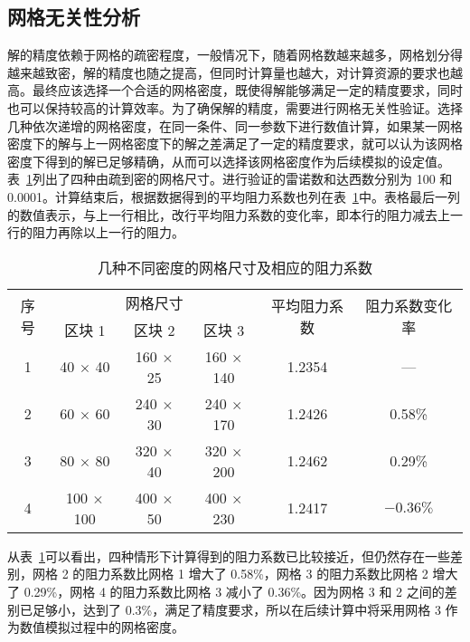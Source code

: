 \subsection{网格无关性分析}\label{sec: grid-independent}

解的精度依赖于网格的疏密程度，一般情况下，随着网格数越来越多，网格划分得越来越致密，解的精度也随之提高，但同时计算量也越大，对计算资源的要求也越高。最终应该选择一个合适的网格密度，既使得解能够满足一定的精度要求，同时也可以保持较高的计算效率。为了确保解的精度，需要进行网格无关性验证。选择几种依次递增的网格密度，在同一条件、同一参数下进行数值计算，如果某一网格密度下的解与上一网格密度下的解之差满足了一定的精度要求，就可以认为该网格密度下得到的解已足够精确，从而可以选择该网格密度作为后续模拟的设定值。表~\ref{tab: grid}列出了四种由疏到密的网格尺寸。进行验证的雷诺数和达西数分别为 100 和 0.0001。计算结束后，根据数据得到的平均阻力系数也列在表~\ref{tab: grid}中。表格最后一列的数值表示，与上一行相比，改行平均阻力系数的变化率，即本行的阻力减去上一行的阻力再除以上一行的阻力。

\begin{table}
	\caption{几种不同密度的网格尺寸及相应的阻力系数}\label{tab: grid}
	\vspace{.5em}\centering\wuhao
	\begin{tabular}{cccccc}
		\toprule[1.5pt]
		\multirow{2}[3]{*}{序号} & \multicolumn{3}{c}{网格尺寸} & \multirow{2}[3]{*}{平均阻力系数} & \multirow{2}[3]{*}{阻力系数变化率} \\
		\cmidrule[.67pt](lr){2-4}
		& 区块 1 & 区块 2 & 区块 3 & & \\
		\midrule[1pt]
		1 & 40 $\times$ 40 & 160 $\times$ 25 & 160 $\times$ 140 & 1.2354 & — \\
		2 & 60 $\times$ 60 & 240 $\times$ 30 & 240 $\times$ 170 & 1.2426 & 0.58\% \\
		3 & 80 $\times$ 80 & 320 $\times$ 40 & 320 $\times$ 200 & 1.2462 & 0.29\% \\
		4 & 100 $\times$ 100 & 400 $\times$ 50 & 400 $\times$ 230 & 1.2417 & $-0.36\%$ \\
		\bottomrule[1.5pt]
	\end{tabular}
\end{table}

从表~\ref{tab: grid}可以看出，四种情形下计算得到的阻力系数已比较接近，但仍然存在一些差别，网格 2 的阻力系数比网格 1 增大了 0.58\%，网格 3 的阻力系数比网格 2 增大了 0.29\%，网格 4 的阻力系数比网格 3 减小了 0.36\%。因为网格 3 和 2 之间的差别已足够小，达到了 0.3\%，满足了精度要求，所以在后续计算中将采用网格 3 作为数值模拟过程中的网格密度。

